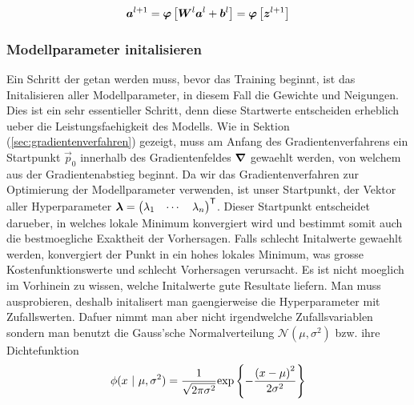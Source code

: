 \documentclass[../main]{subfiles}
\begin{document}
\begin{equation}\label{eq:aktivierung_matrix}
  \bm{a}^{l+1} = \bm{\varphi} \left[\bm{W}^{l} \bm{a}^{l} + \bm{b}^{l} \right] = \bm{\varphi} \left[ \bm{z}^{l+1} \right]
\end{equation}

\para{}
\cite{Nielsen}

\subsubsection{Modellparameter initalisieren}
Ein Schritt der getan werden muss, bevor das Training beginnt, ist das
Initalisieren aller Modellparameter, in diesem Fall die Gewichte und Neigungen.
Dies ist ein sehr essentieller Schritt, denn diese Startwerte entscheiden
erheblich ueber die Leistungsfaehigkeit des Modells.
\para{}
Wie in Sektion (\ref{sec:gradientenverfahren}) gezeigt, muss am Anfang des
Gradientenverfahrens ein Startpunkt $\vec{p}_0$ innerhalb des Gradientenfeldes
$\bm{\nabla}$ gewaehlt werden, von welchem aus der Gradientenabstieg beginnt.
Da wir das Gradientenverfahren zur Optimierung der Modellparameter verwenden,
ist unser Startpunkt, der Vektor aller Hyperparameter
$\bm{\lambda} = \begin{pmatrix} \lambda_1 & \cdots & \lambda_n \end{pmatrix}^{\mathsf{T}}$.
Dieser Startpunkt entscheidet darueber, in welches lokale Minimum konvergiert
wird und bestimmt somit auch die bestmoegliche Exaktheit der Vorhersagen. Falls
schlecht Initalwerte gewaehlt werden, konvergiert der Punkt in ein hohes lokales
Minimum, was grosse Kostenfunktionswerte und schlecht Vorhersagen verursacht.
\para{}
Es ist nicht moeglich im Vorhinein zu wissen, welche Initalwerte gute Resultate
liefern. Man muss ausprobieren, deshalb initalisert man gaengierweise die
Hyperparameter mit Zufallswerten. Dafuer nimmt man aber nicht irgendwelche
Zufallsvariablen sondern man benutzt die Gauss'sche Normalverteilung
$\mathcal{N}(\mu,\sigma^2)$ bzw. ihre Dichtefunktion
\[\ds \phi(x\ |\ \mu,\sigma^2) = \frac{1}{\sqrt{2\pi\sigma^2}} \text{exp} \left\{-\frac{{(x-\mu)}^2}{2\sigma^2}\right\} \]
\para{}


\end{document}
